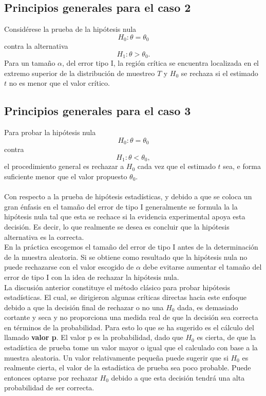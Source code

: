 \subsection{Principios generales para el caso 2}
Considérese la prueba de la hipótesis nula
$$H_0:\theta=\theta_0$$
contra la alternativa
$$H_1:\theta>\theta_0.$$
Para un tamaño $\alpha$, del error tipo I, la región crítica se encuentra localizada en el extremo superior de la distribución de muestreo $T$ y $H_0$ se rechaza si el estimado $t$ no es menor que el valor crítico. 

\subsection{Principios generales para el caso 3}
Para probar la hipótesis nula
$$H_0:\theta=\theta_0$$
contra
$$H_1:\theta<\theta_0,$$
el procedimiento general es rechazar a $H_0$ cada vez que el estimado $t$ sea, e forma suficiente menor que el valor propuesto $\theta_0$.\\\\

Con respecto a la prueba de hipótesis estadísticas, y debido a que se coloca un gran énfasis en el tamaño del error de tipo I generalmente se formula la la hipótesis nula tal que esta se rechace si la evidencia experimental apoya esta decisión. Es decir, lo que realmente se desea es concluir que la hipótesis alternativa es la correcta. \\
En la práctica escogemos el tamaño del error de tipo I antes de la determinación de la muestra aleatoria. Si se obtiene como resultado que la hipótesis nula no puede rechazarse con el valor escogido de $\alpha$ debe evitarse aumentar el tamaño del error de tipo I con la idea de rechazar la hipótesis nula.\\

La discusión anterior constituye el método clásico para probar hipótesis estadísticas. El cual, se dirigieron algunas críticas directas hacia este enfoque debido a que la decisión final de rechazar o no una $H_0$ dada, es demasiado cortante y seca y no proporciona una medida real de que la decisión sea correcta en términos de la probabilidad. Para esto lo que se ha sugerido es el cálculo del llamado \textbf{valor p}. El valor p es la probabilidad, dado que $H_0$ es cierta, de que la estadística de prueba tome un valor mayor o igual que el calculado con base a la muestra aleatoria. Un valor relativamente pequeña puede sugerir que si $H_0$ es realmente cierta, el valor de la estadística de prueba sea poco probable. Puede entonces optarse por rechazar $H_0$ debido a que esta decisión tendrá una alta probabilidad de ser correcta.\\


